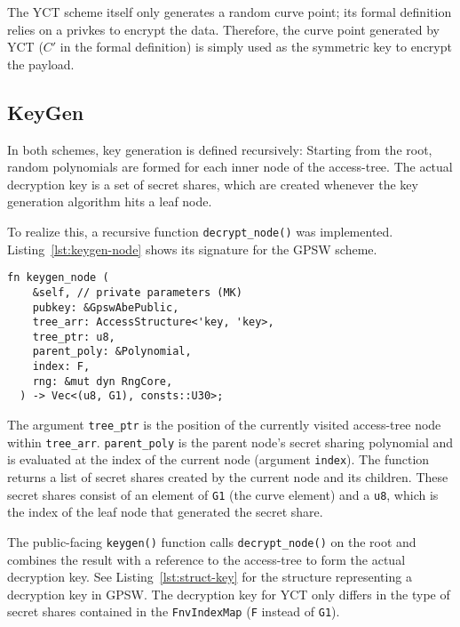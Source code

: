The YCT scheme itself only generates a random curve point; its formal definition relies on a \gls{privkes} to encrypt the data.
Therefore, the curve point generated by YCT ($C'$ in the formal definition) is simply used as the symmetric key to encrypt the payload.
  

\subsection{KeyGen}
In both schemes, key generation is defined recursively:
Starting from the root, random polynomials are formed for each inner node of the \gls{access-tree}.
The actual decryption key is a set of secret shares, which are created whenever the key generation algorithm hits a leaf node.

To realize this, a recursive function \verb+decrypt_node()+ was implemented.
Listing~\ref{lst:keygen-node} shows its signature for the GPSW scheme. 

\begin{lstlisting}[caption={Function signature of recursive key generation},label={lst:keygen-node}]
fn keygen_node (
    &self, // private parameters (MK)
    pubkey: &GpswAbePublic,
    tree_arr: AccessStructure<'key, 'key>,
    tree_ptr: u8,
    parent_poly: &Polynomial,
    index: F,
    rng: &mut dyn RngCore,
  ) -> Vec<(u8, G1), consts::U30>;
\end{lstlisting}

The argument \verb+tree_ptr+ is the position of the currently visited \gls{access-tree} node within \verb+tree_arr+.
\verb+parent_poly+ is the parent node's secret sharing polynomial and is evaluated at the index of the current node (argument \texttt{index}).
The function returns a list of secret shares created by the current node and its children. 
These secret shares consist of an element of \texttt{G1} (the curve element) and a \texttt{u8}, which is the index of the leaf node that generated the secret share.

The public-facing \verb+keygen()+ function calls \verb+decrypt_node()+ on the root and combines the result with a reference to the \gls{access-tree} to form the actual decryption key.
See Listing~\ref{lst:struct-key} for the structure representing a decryption key in GPSW.
The decryption key for YCT only differs in the type of secret shares contained in the \texttt{FnvIndexMap} (\texttt{F} instead of \texttt{G1}).

